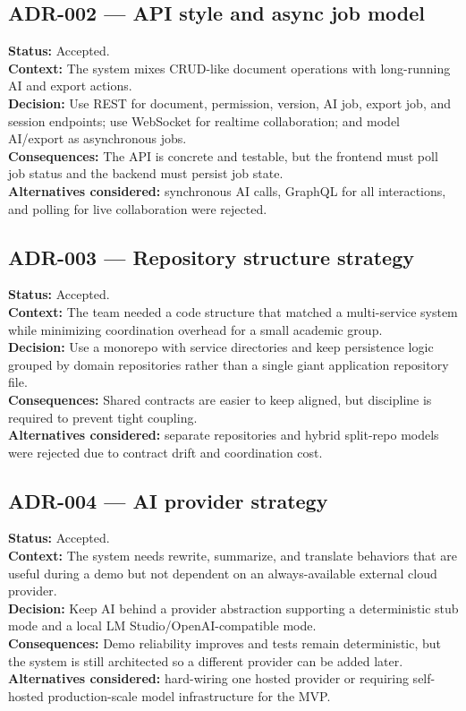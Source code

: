 \subsection*{ADR-002 --- API style and async job model}
\textbf{Status:} Accepted.\\
\textbf{Context:} The system mixes CRUD-like document operations with long-running AI and export actions.\\
\textbf{Decision:} Use REST for document, permission, version, AI job, export job, and session endpoints;
use WebSocket for realtime collaboration; and model AI/export as asynchronous jobs.\\
\textbf{Consequences:} The API is concrete and testable, but the frontend must poll job status and the
backend must persist job state.\\
\textbf{Alternatives considered:} synchronous AI calls, GraphQL for all interactions, and polling for live
collaboration were rejected.

\subsection*{ADR-003 --- Repository structure strategy}
\textbf{Status:} Accepted.\\
\textbf{Context:} The team needed a code structure that matched a multi-service system while minimizing
coordination overhead for a small academic group.\\
\textbf{Decision:} Use a monorepo with service directories and keep persistence logic grouped by domain
repositories rather than a single giant application repository file.\\
\textbf{Consequences:} Shared contracts are easier to keep aligned, but discipline is required to prevent
tight coupling.\\
\textbf{Alternatives considered:} separate repositories and hybrid split-repo models were rejected due to
contract drift and coordination cost.

\subsection*{ADR-004 --- AI provider strategy}
\textbf{Status:} Accepted.\\
\textbf{Context:} The system needs rewrite, summarize, and translate behaviors that are useful during a
demo but not dependent on an always-available external cloud provider.\\
\textbf{Decision:} Keep AI behind a provider abstraction supporting a deterministic stub mode and a local
LM Studio/OpenAI-compatible mode.\\
\textbf{Consequences:} Demo reliability improves and tests remain deterministic, but the system is still
architected so a different provider can be added later.\\
\textbf{Alternatives considered:} hard-wiring one hosted provider or requiring self-hosted production-scale
model infrastructure for the MVP.
